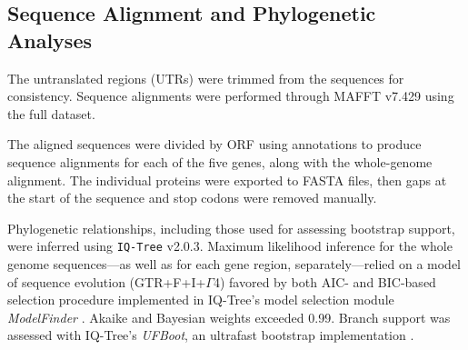 \documentclass[fleqn,10pt,lineno]{wlpeerj}
\begin{document}
\subsection*{Sequence Alignment and Phylogenetic Analyses}
The untranslated regions (UTRs) were trimmed from the sequences for consistency.
Sequence alignments were performed through MAFFT v7.429 \citep{katoh_mafft_2002} using the full dataset.

The aligned sequences were divided by ORF using annotations to produce sequence alignments for each of the five genes, along with the whole-genome alignment. 
The individual proteins were exported to FASTA files, then gaps at the start of the sequence and stop codons were removed manually. 

Phylogenetic relationships, including those used for assessing bootstrap support, were inferred using \texttt{IQ-Tree} v2.0.3. 
Maximum likelihood inference for the whole genome sequences---as well as for each gene region, separately---relied on a model of sequence evolution (GTR+F+I+$\Gamma$4) favored by both AIC- and BIC-based selection procedure implemented in IQ-Tree's model selection module {\em ModelFinder} \citep{kalyaanamoorthy2017}. Akaike and Bayesian weights exceeded 0.99. 
Branch support was assessed with IQ-Tree's {\em UFBoot}, an ultrafast bootstrap implementation \citep{hoang2018}.


\end{document}
